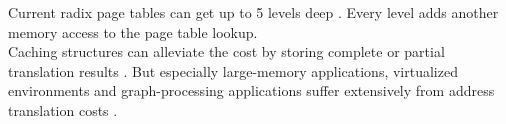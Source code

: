 Current radix page tables can get up to 5 levels deep \cite{intel5LevelPaging5Level2017}. Every level
adds another memory access to the page table lookup.\\
Caching structures can alleviate the cost by storing complete or partial translation results \cite{van2002memory}.
But especially large-memory applications, virtualized environments and graph-processing applications
suffer extensively from address translation costs \cite{zagieboylo2020cost}.
